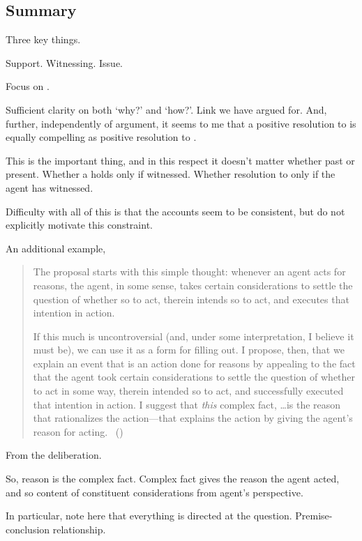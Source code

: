 \subsection{Summary}
\label{cha:clar:expand:issue:summary}

\begin{note}
  Three key things.

  Support.
  Witnessing.
  Issue.
\end{note}

\begin{note}
  Focus on \issueConstraint{}.
  \vspace{-\baselineskip}
  \begin{quote}
    \rIssueConstraint*
  \end{quote}
  Sufficient clarity on both `why?' and `how?'.
  Link we have argued for.
  And, further, independently of argument, it seems to me that a positive resolution to \issueConstraint{} is equally compelling as positive resolution to \issueInclusion{}.
\end{note}

\begin{note}
  This is the important thing, and in this respect it doesn't matter whether past or present.
  Whether a \support{} holds only if witnessed.
  Whether resolution to \qWhy{} only if the agent has witnessed.
\end{note}

\begin{note}
  Difficulty with all of this is that the accounts seem to be consistent, but do not explicitly motivate this constraint.
\end{note}

\begin{note}
  An additional example, \citeauthor{Hieronymi:2011aa}
  \begin{quote}
    The proposal starts with this simple thought: whenever an agent acts for reasons, the agent, in some sense, takes certain considerations to settle the question of whether so to act, therein intends so to act, and executes that intention in action.

    If this much is uncontroversial (and, under some interpretation, I believe it must be), we can use it as a form for filling out.
    I propose, then, that we explain an event that is an action done for reasons by appealing to the fact that the agent took certain considerations to settle the question of whether to act in some way, therein intended so to act, and successfully executed that intention in action.
    I suggest that \emph{this} complex fact, \dots is the reason that rationalizes the action---that explains the action by giving the agent’s reason for acting.%
    \mbox{ }\hfill\mbox{(\citeyear[431]{Hieronymi:2011aa})}
  \end{quote}

  From the deliberation.

  So, reason is the complex fact.
  Complex fact gives the reason the agent acted, and so content of constituent considerations from agent's perspective.

  In particular, note here that everything is directed at the question.
  Premise-conclusion relationship.
\end{note}

